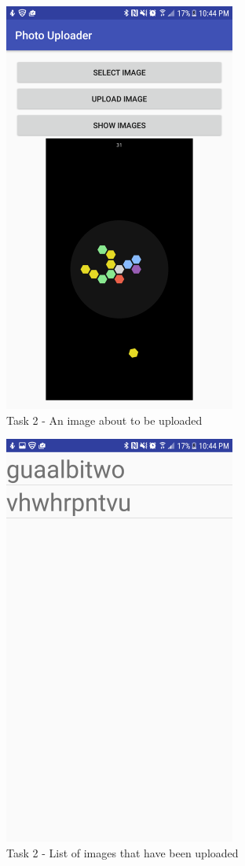 \documentclass{article}
\begin{document}
	\begin{figure}[ht]
		\includegraphics[width=3in]{img/t2s2.png}
		\centering
        \caption{Task 2 - An image about to be uploaded}
	\end{figure}
	\begin{figure}[ht]
		\includegraphics[width=3in]{img/t2s3.png}
		\centering
        \caption{Task 2 - List of images that have been uploaded}
	\end{figure}
\end{document}
